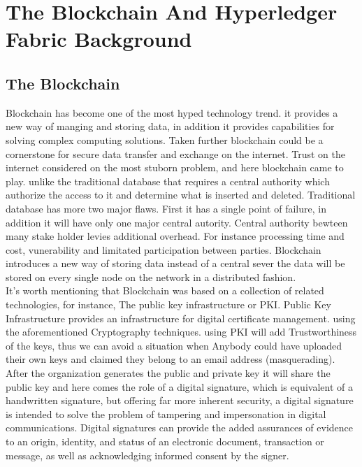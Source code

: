 \chapter{The Blockchain And Hyperledger Fabric Background}


\section{The Blockchain} 


 Blockchain has become one of the most hyped technology trend. it provides a new way of manging and storing data, in addition it provides capabilities for solving complex computing solutions. Taken further blockchain could be a cornerstone for secure data transfer and exchange on the internet.
Trust on the internet considered on the most stuborn problem, and here blockchain came to play. unlike the traditional database that requires a central authority which authorize the access to it and determine what is inserted and deleted. Traditional database has more two major flaws. 
First it has a single point of failure, in addition it will have only one major central autority. Central authority bewteen many stake holder levies additional overhead. 
For instance processing time and cost, vunerability and limitated participation between parties.  
Blockchain introduces a new way of storing data instead of a central sever the data will be stored on every single node on the network in a distributed fashion. 
\\

It's worth mentioning that Blockchain was based on a collection of related technologies, for instance, The public key infrastructure or PKI.
Public Key Infrastructure provides an infrastructure for digital certificate management. using the
aforementioned Cryptography techniques. using PKI will add Trustworthiness of the keys, thus we
can avoid a situation when Anybody could have uploaded their own keys and claimed they belong
to an email address (masquerading). After the organization generates the public and private key
it will share the public key and here comes the role of a digital signature, which is equivalent of
a handwritten signature, but offering far more inherent security, a digital signature is intended to
solve the problem of tampering and impersonation in digital communications. Digital signatures can
provide the added assurances of evidence to an origin, identity, and status of an electronic document,
transaction or message, as well as acknowledging informed consent by the signer. \\


